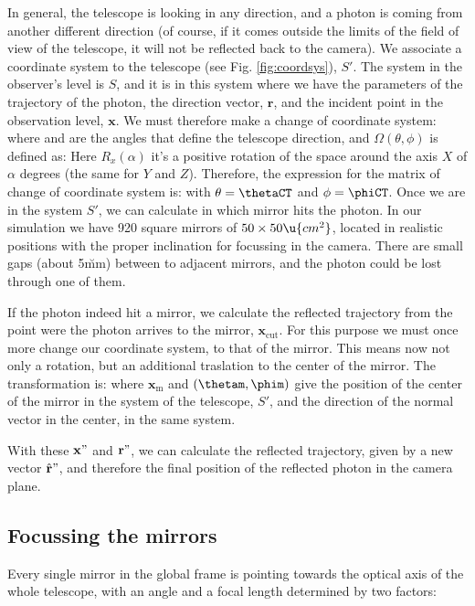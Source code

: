 In general, the telescope is looking in any direction, and a photon is
coming from another different direction (of course, if it comes
outside the limits of the field of view of the telescope, it will not
be reflected back to the camera). We associate a coordinate system to the
telescope (see Fig. \ref{fig:coordsys}), $S'$. The system in the
observer's level is $S$, and it is in this system where we have the
parameters of the trajectory of the photon, the direction vector,
$\mathbf{r}$, and the incident point in the observation level,
$\mathbf{x}$. We must therefore make a change of coordinate system:
%
\rotateAeq
%
where \thetaCT and \phiCT are the angles that define the telescope
direction, and $\Omega(\theta,\phi)$ is defined as:
%
\omegaAeq
%
Here $R_x(\alpha)$ it's a positive rotation of the space around the
axis $X$ of $\alpha$ degrees (the same for $Y$ and $Z$). Therefore,
the expression for the matrix of change of coordinate system is:
%
\transformAeq
%
with $\theta=\thetaCT$ and $\phi=\phiCT$. Once we are in the system
$S'$, we can calculate in which mirror hits the photon. In our
simulation we have 920 square mirrors of $50\times 50\u{cm^2}$,
located in realistic positions with the proper inclination for
focussing in the camera. There are small gaps (about 5\u{mm}) between
to adjacent mirrors, and the photon could be lost through one of them.

If the photon indeed hit a mirror, we calculate the reflected
trajectory from the point were the photon arrives to the mirror,
$\mathbf{x}_{\mathrm{cut}}$. For this purpose we must once more change
our coordinate system, to that of the mirror. This means now not only
a rotation, but an additional traslation to the center of the mirror.
The transformation is:
%
\transformBeq
%
where $\mathbf{x}_{\mathrm{m}}$ and $(\thetam,\phim)$ give the
position of the center of the mirror in the system of the telescope,
$S'$, and the direction of the normal vector in the center, in the
same system.

With these $\mathbf{x}"$ and $\mathbf{r}"$, we can calculate the
reflected trajectory, given by a new vector $\hat{\mathbf{r}}"$, and
therefore the final position of the reflected photon in the camera
plane.

\subsection{Focussing the mirrors}

Every single mirror in the global frame is pointing towards the
optical axis of the whole telescope, with an angle and a focal length
determined by two factors:

